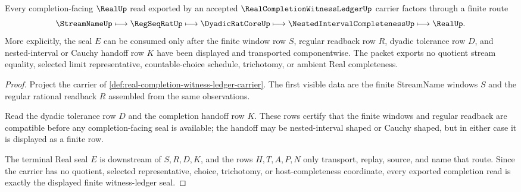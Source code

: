 \begin{theorem}
\label{thm:real-completion-witness-ledger-seal}
Every completion-facing $\RealUp$ read exported by an accepted $\RealCompletionWitnessLedgerUp$ carrier factors through a finite route
$$
\StreamNameUp \longmapsto \RegSeqRatUp \longmapsto \DyadicRatCoreUp \longmapsto \NestedIntervalCompletenessUp \longmapsto \RealUp .
$$
More explicitly, the seal $E$ can be consumed only after the finite window row $S$, regular readback row $R$, dyadic tolerance row $D$, and nested-interval or Cauchy handoff row $K$ have been displayed and transported componentwise. The packet exports no quotient stream equality, selected limit representative, countable-choice schedule, trichotomy, or ambient Real completeness.
\end{theorem}
\begin{proof}
Project the carrier of \autoref{def:real-completion-witness-ledger-carrier}. The first visible data are the finite StreamName windows $S$ and the regular rational readback $R$ assembled from the same observations.

Read the dyadic tolerance row $D$ and the completion handoff row $K$. These rows certify that the finite windows and regular readback are compatible before any completion-facing seal is available; the handoff may be nested-interval shaped or Cauchy shaped, but in either case it is displayed as a finite row.

The terminal Real seal $E$ is downstream of $S,R,D,K$, and the rows $H,T,A,P,N$ only transport, replay, source, and name that route. Since the carrier has no quotient, selected representative, choice, trichotomy, or host-completeness coordinate, every exported completion read is exactly the displayed finite witness-ledger seal.
\end{proof}


\begin{closurestatus}{\RealCompletionWitnessLedgerUp}
  \theoryclosure{\seedClosure}
  \formalstatus{\unformalizedV}
\end{closurestatus}
